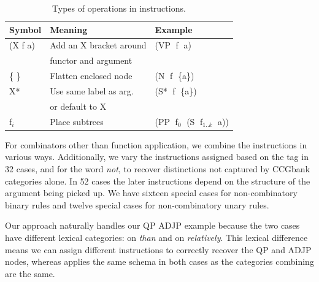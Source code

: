 \begin{table}
\small
\begin{center}
\renewcommand{\tabcolsep}{1mm}
\begin{tabular}{lll}
	\hline
		Symbol & Meaning & Example \\
	\hline
	\hline
		(X f a) & Add an X bracket around & (VP$\;$ f$\;$ a) \\
		& functor and argument \\
		\{ \} & Flatten enclosed node & (N$\;$ f$\;$ \{a\}) \\
		X* & Use same label as arg. & (S*$\;$ f$\;$ \{a\}) \\
		& or default to X \\
		f$_i$ & Place subtrees &  (PP$\;$ f$_0$$\;$ (S$\;$ f$_{1..k}$$\;$ a)) \\
	\hline
\end{tabular}
\end{center}
\caption{\label{tab:operators}
Types of operations in instructions.
}
\end{table}


For combinators other than function application, we combine the instructions in
various ways.  Additionally, we vary the instructions assigned based on the
\pos tag in 32 cases, and for the word \textit{not}, to recover distinctions
not captured by CCGbank categories alone.  In 52 cases the later
instructions depend on the structure of the argument being picked up.  We have
sixteen special cases for non-combinatory binary rules and twelve special
cases for non-combinatory unary rules.

Our approach naturally handles our QP \myvs ADJP example because the two cases
have different lexical categories: {\small{}}
on \textit{than} and {\small {}} on \textit{relatively}.  This
lexical difference means we can assign different instructions to correctly
recover the QP and ADJP nodes, whereas \old applies the same schema in both
cases as the categories combining are the same.

